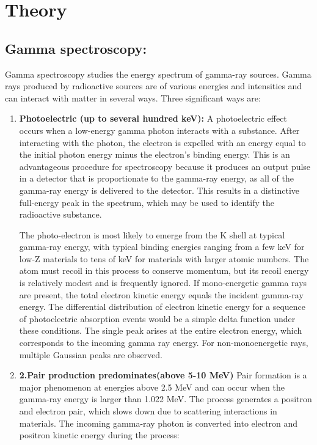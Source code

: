 \section{Theory}

	\subsection{Gamma spectroscopy:}
		Gamma spectroscopy studies the energy spectrum  of gamma-ray sources. Gamma rays produced by radioactive sources are of various energies and intensities and can interact with matter in several ways. Three significant ways are:

		\begin{enumerate}
			\item \textbf{Photoelectric (up to several hundred keV):} A photoelectric effect occurs when a low-energy gamma photon interacts with a substance. After interacting with the photon, the electron is expelled with an energy equal to the initial photon energy minus the electron's binding energy. This is an advantageous procedure for spectroscopy because it produces an output pulse in a detector that is proportionate to the gamma-ray energy, as all of the gamma-ray energy is delivered to the detector. This results in a distinctive full-energy peak in the spectrum, which may be used to identify the radioactive substance.

			\indent The photo-electron is most likely to emerge from the K shell at typical gamma-ray energy, with typical binding energies ranging from a few keV for low-Z materials to tens of keV for materials with larger atomic numbers. The atom must recoil in this process to conserve momentum, but its recoil energy is relatively modest and is frequently ignored. If mono-energetic gamma rays are present, the total electron kinetic energy equals the incident gamma-ray energy. The differential distribution of electron kinetic energy for a sequence of photoelectric absorption events would be a simple delta function under these conditions. The single peak arises at the entire electron energy, which corresponds to the incoming gamma ray energy. For non-monoenergetic rays, multiple Gaussian peaks are observed.
		
			\item \textbf{2.Pair production predominates(above 5-10 MeV)} Pair formation is a major phenomenon at energies above 2.5 MeV and can occur when the gamma-ray energy is larger than 1.022 MeV. The process generates a positron and electron pair, which slows down due to scattering interactions in materials. The incoming gamma-ray photon is converted into electron and positron kinetic energy during the process:


\end{enumerate}
